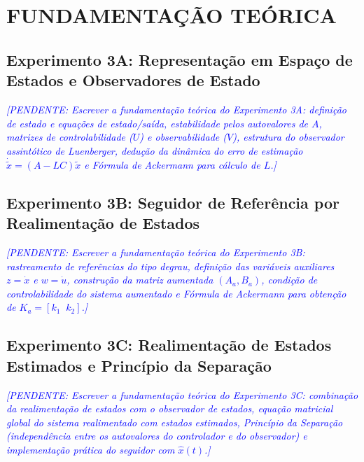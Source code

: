 \documentclass[a4paper,12pt]{article}
\newcommand{\pendente}[1]{\textcolor{blue}{\textit{[PENDENTE: #1]}}}
\newcommand{\pendente}[1]{}
\begin{document}
\newpage


\section{FUNDAMENTAÇÃO TEÓRICA}

\subsection{Experimento 3A: Representação em Espaço de Estados e Observadores de Estado}

\begin{justify}
    \pendente{Escrever a fundamentação teórica do Experimento 3A: definição de estado e equações de estado/saída, estabilidade pelos autovalores de $A$, matrizes de controlabilidade ($U$) e observabilidade ($V$), estrutura do observador assintótico de Luenberger, dedução da dinâmica do erro de estimação $\dot{\tilde{x}} = (A - LC)\tilde{x}$ e Fórmula de Ackermann para cálculo de $L$.}
\end{justify}

\subsection{Experimento 3B: Seguidor de Referência por Realimentação de Estados}

\begin{justify}
    \pendente{Escrever a fundamentação teórica do Experimento 3B: rastreamento de referências do tipo degrau, definição das variáveis auxiliares $z = \dot{x}$ e $w = \dot{u}$, construção da matriz aumentada $(A_a, B_a)$, condição de controlabilidade do sistema aumentado e Fórmula de Ackermann para obtenção de $K_a = [k_1 \;\; k_2]$.}
\end{justify}

\subsection{Experimento 3C: Realimentação de Estados Estimados e Princípio da Separação}

\begin{justify}
    \pendente{Escrever a fundamentação teórica do Experimento 3C: combinação da realimentação de estados com o observador de estados, equação matricial global do sistema realimentado com estados estimados, Princípio da Separação (independência entre os autovalores do controlador e do observador) e implementação prática do seguidor com $\hat{x}(t)$.}
\end{justify}
\end{document}
